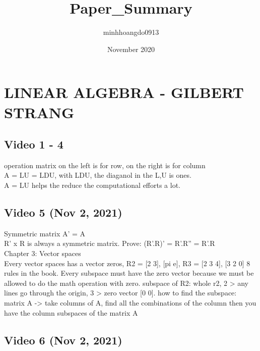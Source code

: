 \documentclass{article}
\title{Paper_Summary}
\author{minhhoangdo0913 }
\date{November 2020}
\begin{document}
\tableofcontents

\section{LINEAR ALGEBRA - GILBERT STRANG}
\subsection{Video 1 - 4}

operation matrix on the left is for row, on the right is for column
\\A = LU = LDU, with LDU, the diaganol in the L,U is ones.
\\A = LU helps the reduce the computational efforts a lot.


\subsection{Video 5 (Nov 2, 2021)}

Symmetric matrix A' = A
\\R' x R is always a symmetric matrix. Prove: (R'.R)' = R'.R'' = R'.R
\\Chapter 3: Vector spaces
\\Every vector spaces has a vector zeros, R2 = [2 3], [pi e], R3 = [2 3 4], [3 2 0]
8 rules in the book.
Every subspace must have the zero vector because we must be allowed to do the math operation with zero.
subspace of R2: whole r2, 2 > any lines go through the origin, 3 > zero vector [0 0].
how to find the subspace: matrix A -> take columns of A, find all the combinations of the column then you have the column subspaces of the matrix A

\subsection{Video 6 (Nov 2, 2021) }
\end{document}
